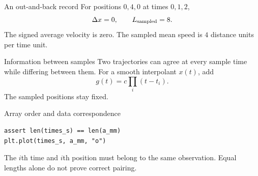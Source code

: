 \documentclass[aspectratio=169,11pt]{beamer}
\newcommand{\notestarget}{notes.pdf}\newcommand{\noteslabel}{Notes}
\begin{document}
\begin{frame}[t,fragile,label=slide-an-out-and-back-record]{An out-and-back record}
For positions $0,4,0$ at times $0,1,2$,
\[
\Delta x=0,\qquad L_{\rm sampled}=8.
\]
\pause{}
The signed average velocity is zero. The sampled mean speed is $4$ distance units per time unit.
\end{frame}
\renewcommand{\notestarget}{notes.pdf\#note-information-between-samples}
\begin{frame}[t,fragile,label=slide-information-between-samples]{Information between samples}
Two trajectories can agree at every sample time while differing between them.
\pause{}
For a smooth interpolant $x(t)$, add
\[
g(t)=c\prod_i(t-t_i).
\]
The sampled positions stay fixed.
\end{frame}
\renewcommand{\notestarget}{notes.pdf\#note-information-between-samples}
\begin{frame}[t,fragile,label=slide-array-order-and-data-correspondence]{Array order and data correspondence}
\begin{verbatim}
assert len(times_s) == len(a_mm)
plt.plot(times_s, a_mm, "o")
\end{verbatim}
\pause{}
The $i$th time and $i$th position must belong to the same observation. Equal lengths alone do not prove correct pairing.
\end{frame}
\end{document}
